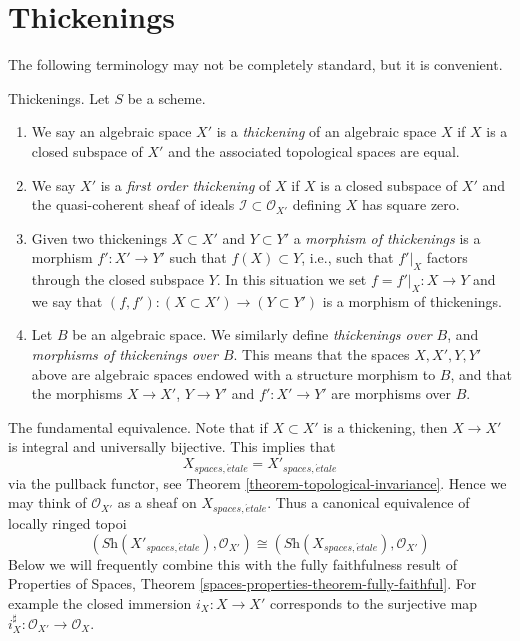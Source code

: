 \section{Thickenings}
\label{section-thickenings}

\noindent
The following terminology may not be completely standard, but it is convenient.

\begin{definition}
\label{definition-thickening}
Thickenings. Let $S$ be a scheme.
\begin{enumerate}
\item We say an algebraic space $X'$ is a {\it thickening} of an algebraic
space $X$ if $X$ is a closed subspace of $X'$ and the associated topological
spaces are equal.
\item We say $X'$ is a {\it first order thickening} of $X$ if
$X$ is a closed subspace of $X'$ and the quasi-coherent sheaf of ideals
$\mathcal{I} \subset \mathcal{O}_{X'}$ defining $X$ has square zero.
\item Given two thickenings $X \subset X'$ and $Y \subset Y'$ a
{\it morphism of thickenings} is a morphism $f' : X' \to Y'$ such that
$f(X) \subset Y$, i.e., such that $f'|_X$ factors through the closed
subspace $Y$. In this situation we set $f = f'|_X : X \to Y$ and we say
that $(f, f') : (X \subset X') \to (Y \subset Y')$ is a morphism of
thickenings.
\item Let $B$ be an algebraic space. We similarly define
{\it thickenings over $B$}, and
{\it morphisms of thickenings over $B$}. This means that the spaces
$X, X', Y, Y'$ above are algebraic spaces endowed with a structure
morphism to $B$, and that the morphisms
$X \to X'$, $Y \to Y'$ and $f' : X' \to Y'$ are morphisms over $B$.
\end{enumerate}
\end{definition}

\noindent
The fundamental equivalence.
Note that if $X \subset X'$ is a thickening, then $X \to X'$
is integral and universally bijective. This implies that
\begin{equation}
\label{equation-equivalence-etale-spaces}
X_{spaces, \acute{e}tale} = X'_{spaces, \acute{e}tale}
\end{equation}
via the pullback functor, see
Theorem \ref{theorem-topological-invariance}.
Hence we may think of $\mathcal{O}_{X'}$ as a sheaf on
$X_{spaces, \acute{e}tale}$. Thus a canonical equivalence
of locally ringed topoi
\begin{equation}
\label{equation-fundamental-equivalence}
(\textit{Sh}(X'_{spaces, \acute{e}tale}), \mathcal{O}_{X'})
\cong
(\textit{Sh}(X_{spaces, \acute{e}tale}), \mathcal{O}_{X'})
\end{equation}
Below we will frequently combine this with the fully faithfulness result of
Properties of Spaces, Theorem \ref{spaces-properties-theorem-fully-faithful}.
For example the closed immersion $i_X : X \to X'$ corresponds
to the surjective map $i_X^\sharp : \mathcal{O}_{X'} \to \mathcal{O}_X$.

